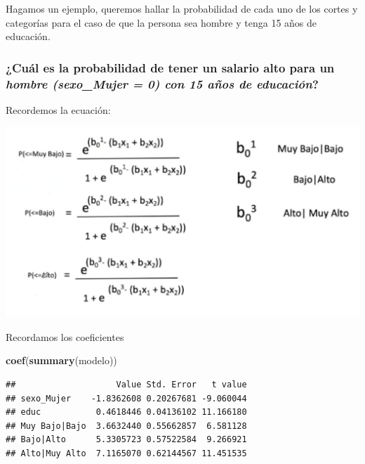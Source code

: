\documentclass[
]{article}
\newenvironment{Shaded}{\begin{snugshade}}{\end{snugshade}}
\newcommand{\FunctionTok}[1]{\textcolor[rgb]{0.13,0.29,0.53}{\textbf{#1}}}
\newcommand{\NormalTok}[1]{#1}
\begin{document}
Hagamos un ejemplo, queremos hallar la probabilidad de cada uno de los
cortes y categorías para el caso de que la persona sea hombre y tenga 15
años de educación.

\hypertarget{cuuxe1l-es-la-probabilidad-de-tener-un-salario-alto-para-un-hombre-sexo_mujer-0-con-15-auxf1os-de-educaciuxf3n}{%
\subsubsection{\texorpdfstring{¿Cuál es la probabilidad de tener un
salario alto para un \emph{hombre (sexo\_Mujer = 0) con 15 años de
educación}?}{¿Cuál es la probabilidad de tener un salario alto para un hombre (sexo\_Mujer = 0) con 15 años de educación?}}\label{cuuxe1l-es-la-probabilidad-de-tener-un-salario-alto-para-un-hombre-sexo_mujer-0-con-15-auxf1os-de-educaciuxf3n}}

Recordemos la ecuación:

\begin{center}\includegraphics[width=0.8\linewidth]{EcuacionOrdinal} \end{center}

Recordamos los coeficientes

\begin{Shaded}
\begin{Highlighting}[]
\FunctionTok{coef}\NormalTok{(}\FunctionTok{summary}\NormalTok{(modelo))}
\end{Highlighting}
\end{Shaded}

\begin{verbatim}
##                    Value Std. Error   t value
## sexo_Mujer    -1.8362608 0.20267681 -9.060044
## educ           0.4618446 0.04136102 11.166180
## Muy Bajo|Bajo  3.6632440 0.55662857  6.581128
## Bajo|Alto      5.3305723 0.57522584  9.266921
## Alto|Muy Alto  7.1165070 0.62144567 11.451535
\end{verbatim}
\end{document}
